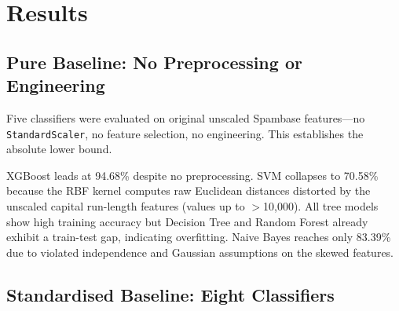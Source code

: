 \documentclass[conference]{IEEEtran}
\begin{document}
\section{Results}

\subsection{Pure Baseline: No Preprocessing or Engineering}

Five classifiers were evaluated on original unscaled Spambase features---no \texttt{StandardScaler}, no feature selection, no engineering. This establishes the absolute lower bound.

\begin{table}[htbp]
\caption{Pure Baseline: Original Features, No Scaling (Spambase, 4,601 samples)}
\label{tab:raw_baseline}
\centering
{}
\end{table}

XGBoost leads at 94.68\% despite no preprocessing. SVM collapses to 70.58\% because the RBF kernel computes raw Euclidean distances distorted by the unscaled capital run-length features (values up to $>$10,000). All tree models show high training accuracy but Decision Tree and Random Forest already exhibit a train-test gap, indicating overfitting. Naive Bayes reaches only 83.39\% due to violated independence and Gaussian assumptions on the skewed features.

\subsection{Standardised Baseline: Eight Classifiers}
\end{document}
